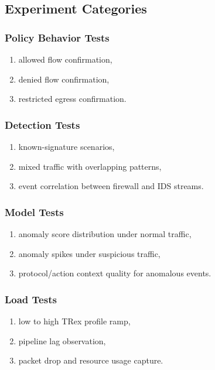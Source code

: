 \documentclass[12pt,a4paper]{article}
\begin{document}
\subsection{Experiment Categories}

\subsubsection{Policy Behavior Tests}
\begin{enumerate}
    \item allowed flow confirmation,
    \item denied flow confirmation,
    \item restricted egress confirmation.
\end{enumerate}

\subsubsection{Detection Tests}
\begin{enumerate}
    \item known-signature scenarios,
    \item mixed traffic with overlapping patterns,
    \item event correlation between firewall and IDS streams.
\end{enumerate}

\subsubsection{Model Tests}
\begin{enumerate}
    \item anomaly score distribution under normal traffic,
    \item anomaly spikes under suspicious traffic,
    \item protocol/action context quality for anomalous events.
\end{enumerate}

\subsubsection{Load Tests}
\begin{enumerate}
    \item low to high TRex profile ramp,
    \item pipeline lag observation,
    \item packet drop and resource usage capture.
\end{enumerate}
\end{document}
